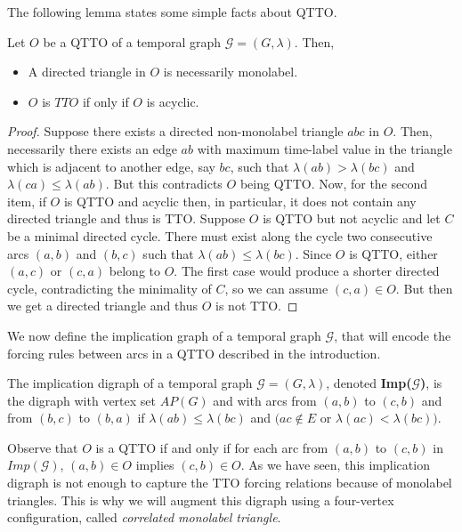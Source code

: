 \documentclass[runningheads]{llncs}
\begin{document}
The following lemma states some simple facts about QTTO.


 \begin{lemma}\label{lem:qtto-monolabel-triangle}
 Let $O$ be a QTTO of a temporal graph $\mathcal{G}=(G,\lambda)$. Then,
\begin{itemize}
\item A directed triangle in $O$ is necessarily monolabel. 
\item $O$ is $TTO$ if only if $O$ is acyclic.
\end{itemize}
 \end{lemma}
 \begin{proof}

Suppose there exists a directed non-monolabel triangle $abc$ in $O$. Then, necessarily there exists an edge $ab$ with maximum time-label value in the triangle which is adjacent to another edge, say $bc$, such that $\lambda(ab) > \lambda(bc)$ and $\lambda(ca) \leq \lambda(ab)$. But this contradicts $O$ being QTTO. Now, for the second item, if $O$ is QTTO and acyclic then, in particular, it does not contain any directed triangle and thus is TTO. Suppose $O$ is QTTO but not acyclic and let $C$ be a minimal directed cycle. There must exist along the cycle two consecutive arcs $(a,b)$ and $(b,c)$ such that $\lambda(ab)\leq \lambda(bc)$. Since $O$ is QTTO, either $(a,c)$ or  $(c,a)$ belong to $O$. The first case would produce a shorter directed cycle, contradicting the minimality of $C$, so we can assume  $(c,a)\in O$. But then we get a directed triangle and thus $O$ is not TTO.
\end{proof}

We now define the implication graph of a temporal graph $\mathcal{G}$, that will encode the forcing rules between arcs in a QTTO described in the introduction.

\begin{definition}
The implication digraph of a temporal graph $\mathcal{G}=(G,\lambda)$, denoted \textbf{Imp($\mathcal{G}$)}, is the digraph with vertex set $AP(G)$ and with arcs from $(a,b)$ to $(c,b)$ and from $(b,c)$ to $(b,a)$ if  $\lambda(ab)\leq \lambda(bc)$ and $(ac \notin E$ or $\lambda(ac)<\lambda(bc))$.
\end{definition}

Observe that $O$ is a QTTO if and only if  for each arc from $(a,b)$ to $(c,b)$ in $Imp(\mathcal{G})$,  $(a,b)\in O$ implies $(c,b)\in O$. As we have seen, this implication digraph is not enough to capture the TTO forcing relations because of monolabel triangles. This is why we will augment this digraph using a four-vertex configuration, called \textit{correlated monolabel triangle}.
\end{document}

